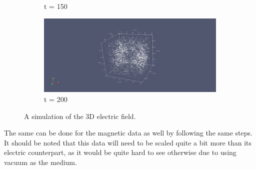 \begin{figure}[h!]
\begin{subfigure}{.49\textwidth}
		\caption{t = 150}
	\end{subfigure}
	\begin{subfigure}{.49\textwidth}
		\centering
		\includegraphics[width=.95\linewidth]{Figures/FDTD3DE4}
		\caption{t = 200}
	\end{subfigure}
	\decoRule
	\caption[3D Electric Field Simulation]{A simulation of the 3D electric field.}
	\label{fig:FDTD3DE}
\end{figure}

The same can be done for the magnetic data as well by following the same steps. It should be noted that this data will need to be scaled quite a bit more than its electric counterpart, as it would be quite hard to see otherwise due to using vacuum as the medium.

